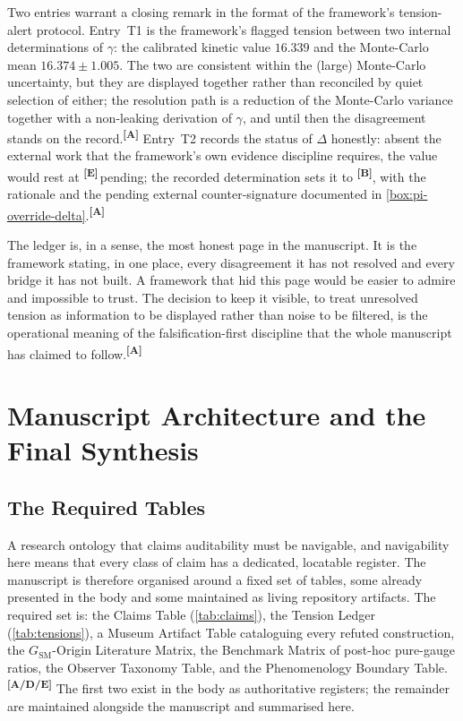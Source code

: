 \documentclass[12pt,a4paper,twoside]{article}
\theoremstyle{plain}
\theoremstyle{definition}
\theoremstyle{remark}
\newcommand{\catmark}[1]{\textsuperscript{\textsf{\textbf{[#1]}}}}
\begin{document}
\noindent Two entries warrant a closing remark in the format of the framework's tension-alert protocol. Entry~T1 is the framework's flagged tension between two internal determinations of $\gamma$: the calibrated kinetic value $16.339$ and the Monte-Carlo mean $16.374 \pm 1.005$. The two are consistent within the (large) Monte-Carlo uncertainty, but they are displayed together rather than reconciled by quiet selection of either; the resolution path is a reduction of the Monte-Carlo variance together with a non-leaking derivation of $\gamma$, and until then the disagreement stands on the record.\catmark{A} Entry~T2 records the status of $\Delta$ honestly: absent the external work that the framework's own evidence discipline requires, the value would rest at \catmark{E}\,pending; the recorded determination sets it to \catmark{B}, with the rationale and the pending external counter-signature documented in \cref{box:pi-override-delta}.\catmark{A}

The ledger is, in a sense, the most honest page in the manuscript. It is the framework stating, in one place, every disagreement it has not resolved and every bridge it has not built. A framework that hid this page would be easier to admire and impossible to trust. The decision to keep it visible, to treat unresolved tension as information to be displayed rather than noise to be filtered, is the operational meaning of the falsification-first discipline that the whole manuscript has claimed to follow.\catmark{A}

\section{Manuscript Architecture and the Final Synthesis}
\label{sec:final-synthesis}

\subsection{The Required Tables}
\label{subsec:required-tables}

A research ontology that claims auditability must be navigable, and navigability here means that every class of claim has a dedicated, locatable register. The manuscript is therefore organised around a fixed set of tables, some already presented in the body and some maintained as living repository artifacts. The required set is: the Claims Table (\cref{tab:claims}), the Tension Ledger (\cref{tab:tensions}), a Museum Artifact Table cataloguing every refuted construction, the $G_{\mathrm{SM}}$-Origin Literature Matrix, the Benchmark Matrix of post-hoc pure-gauge ratios, the Observer Taxonomy Table, and the Phenomenology Boundary Table.\catmark{A/D/E} The first two exist in the body as authoritative registers; the remainder are maintained alongside the manuscript and summarised here.
\end{document}
